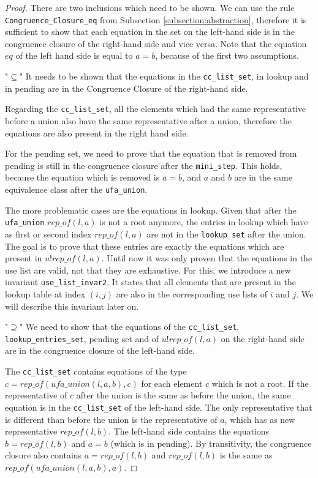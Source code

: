 \begin{proof}
There are two inclusions which need to be shown. We can use the rule \lstinline{Congruence_Closure_eq} from Subsection \ref{subsection:abstraction}, therefore it is sufficient to show that each equation in the set on the left-hand side is in the congruence closure of the right-hand side and vice versa. Note that the equation $eq$ of the left hand side is equal to $a = b$, because of the first two assumptions.

"$\subseteq$" It needs to be shown that the equations in the \lstinline{cc_list_set}, in lookup and in pending are in the Congruence Closure of the right-hand side.

Regarding the \lstinline{cc_list_set}, all the elements which had the same representative before a union also have the same representative after a union, therefore the equations are also present in the right hand side.

For the pending set, we need to prove that the equation that is removed from pending is still in the congruence closure after the \lstinline{mini_step}. This holds, because the equation which is removed is $a = b$, and $a$ and $b$ are in the same equivalence class after the \lstinline{ufa_union}.

The more problematic cases are the equations in lookup. Given that after the \lstinline{ufa_union} $rep\_of(l, a)$ is not a root anymore, the entries in lookup which have as first or second index $rep\_of(l, a)$ are not in the \lstinline{lookup_set} after the union.
The goal is to prove that these entries are exactly the equations which are present in $u ! rep\_of(l, a)$. Until now it was only proven that the equations in the use list are valid, not that they are exhaustive.
For this, we introduce a new invariant \lstinline{use_list_invar2}.
It states that all elements that are present in the lookup table at index $(i, j)$ are also in the corresponding use lists of $i$ and $j$. We will describe this invariant later on.

"$\supseteq$" We need to show that the equations of the \lstinline{cc_list_set}, \lstinline{lookup_entries_set}, pending set and of $u ! rep\_of(l, a)$ on the right-hand side are in the congruence closure of the left-hand side.

The \lstinline{cc_list_set} contains equations of the type $c = rep\_of (ufa\_union(l, a, b), c)$ for each element $c$ which is not a root.
If the representative of $c$ after the union is the same as before the union, the same equation is in the \lstinline{cc_list_set} of the left-hand side.
The only representative that is different than before the union is the representative of $a$, which has as new representative $rep\_of(l, b)$.
The left-hand side contains the equations $b = rep\_of(l, b)$ and $a = b$ (which is in pending).
By transitivity, the congruence closure also contains $a = rep\_of(l, b)$ and $rep\_of(l, b)$ is the same as $rep\_of (ufa\_union(l, a, b), a)$.


\end{proof}
